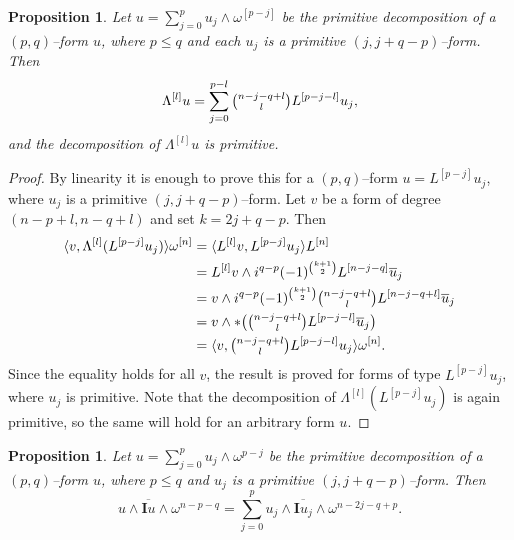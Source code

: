 \documentclass[11pt,a4paper]{amsart}
\def\^#1{^{[#1]}}
\def\I{\mathbf{I}}
\def\la{\langle}
\def\ra{\rangle}
\theoremstyle{slthm}
\newtheorem{prop}[theo]{Proposition}
\theoremstyle{sldef}
\theoremstyle{slrem}
\numberwithin{equation}{section}
\begin{document}
\begin{prop}
    Let $u = \sum_{j=0}^p u_j \wedge \omega\^{p-j}$ be the primitive
decomposition of a $(p,q)$--form $u$, where $p \leq q$ and each $u_j$ is a
primitive $(j,j+q-p)$--form. Then
\begin{equation*}
  \Lambda\^l u 
  = \sum_{j=0}^{p-l} \tbinom{n-j-q+l}{l} L\^{p-j-l} u_j, 
\end{equation*}
and the decomposition of $\Lambda\^l u$ is primitive.
\end{prop}

\begin{proof}
  By linearity it is enough to prove this for a $(p,q)$--form
$u = L\^{p-j} u_j$, where $u_j$ is a primitive $(j,j+q-p)$--form. Let
$v$ be a form of degree $(n-p+l,n-q+l)$ and set $k = 2j+q-p$. Then
  \begin{align*}
    \la v, \Lambda\^l (L\^{p-j} u_j ) \ra \omega\^ n
    &= \la L\^l v, L\^{p-j} u_j \ra L\^ n \\
    &= L\^l v \wedge i^{q-p}(-1)^{\binom{k+1}{2}} L\^{n-j-q} \overline u_j  \\
    &= v \wedge i^{q-p}(-1)^{\binom{k+1}{2}}
    \tbinom{n-j-q+l}{l} L\^{n-j-q+l} \overline u_j  \\
    &= v \wedge * \bigl( \tbinom{n-j-q+l}{l} L\^{p-j-l} \overline u_j \bigr) \\
    &= \la v, \tbinom{n-j-q+l}{l} L\^{p-j-l} u_j \ra \omega\^ n.
  \end{align*}
Since the equality holds for all $v$, the result is proved for forms
of type $L\^{p-j} u_j$, where $u_j$ is primitive. Note that the
decomposition of $\Lambda\^l (L\^{p-j} u_j)$ is again primitive, so
the same will hold for an arbitrary form $u$.
\end{proof}


\begin{prop}
  \label{16}
  Let $u = \sum_{j=0}^p u_j \wedge \omega^{p-j}$ be the primitive
decomposition of a $(p,q)$--form $u$, where $p \leq q$ and $u_j$ is a
primitive $(j,j+q-p)$--form. Then
$$
u \wedge \overline{\I u} \wedge \omega^{n-p-q}
= \sum_{j=0}^p u_j \wedge \overline{\I u_j} \wedge \omega^{n-2j-q+p}.
$$
\end{prop}
\end{document}

